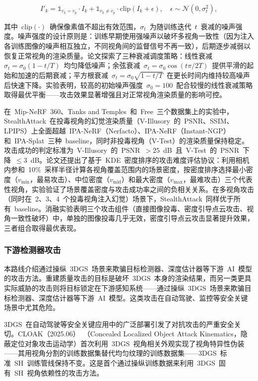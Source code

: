 \begin{equation}
I'_k = \mathbb{1}_{v_k = v_p} \cdot I_k + \mathbb{1}_{v_k \neq v_p} \cdot \mathrm{clip}(I_k + \epsilon), \quad \epsilon \sim \mathcal{N}(0, \sigma_t^2),
\end{equation}

其中~$\mathrm{clip}(\cdot)$~确保像素值不超出有效范围，$\sigma_t$~为随训练迭代~$t$~衰减的噪声强度。噪声强度的设计原则是：训练早期使用强噪声以破坏多视角一致性（因为注入各训练图像的噪声相互独立，不同视角间的监督信号不再一致），后期逐步减弱以恢复正常视角的渲染质量。论文探索了三种衰减调度策略：线性衰减~$\sigma_t = \sigma_0(1 - t/T)$~均匀降低噪声；余弦衰减~$\sigma_t = \sigma_0 \cos(t\pi/2T)$~提供平滑的起始和加速的后期衰减；平方根衰减~$\sigma_t = \sigma_0\sqrt{1 - t/T}$~在更长时间内维持较高噪声后快速下降。实验表明，较高的初始噪声强度~$\sigma_0 = 100$~配合较慢的线性衰减策略取得最优平衡——攻击效果显著增强且对正常视角渲染质量的影响可控。

在~Mip-NeRF~360、Tanks and Temples~和~Free~三个数据集上的实验中，StealthAttack~在投毒视角的幻觉渲染质量（V-Illusory~的~PSNR、SSIM、LPIPS）上全面超越~IPA-NeRF（Nerfacto）、IPA-NeRF（Instant-NGP）和~IPA-Splat~三种~baseline，同时非投毒视角（V-Test）的渲染质量保持稳定。攻击成功的判定标准为~V-Illusory~的~PSNR~$> 25$~dB~且~V-Test~的~PSNR~下降~$\leq 3$~dB。论文还提出了基于~KDE~密度排序的攻击难度评估协议：利用相机内参和~10\%~采样半径计算各视角覆盖范围内的场景密度，按密度排序选择最小密度（$v_{\min}$，最易攻击）、中位密度（$v_{\text{mid}}$）和最大密度（$v_{\max}$，最难攻击）三个代表性视角，实验验证了场景覆盖密度与攻击成功率之间的负相关关系。在多视角攻击（同时在~2、3、4~个投毒视角注入幻觉）场景下，StealthAttack~同样优于所有~baseline。消融实验表明三个攻击组件（直接图像投毒、密度引导点云攻击、视角一致性破坏）中，单独的图像投毒几乎无效，密度引导点云攻击显著提升效果，三者组合取得最优表现。

\subsubsection{下游检测器攻击}

本路线介绍通过操纵~3DGS~场景来欺骗目标检测器、深度估计器等下游~AI~模型的攻击方法。重建质量攻击的目标是破坏~3DGS~本身的渲染结果，而另一类更具实际威胁的攻击则将目标锁定在下游感知系统——通过操纵~3DGS~场景来欺骗目标检测器、深度估计器等下游~AI~模型。这类攻击在自动驾驶、监控等安全关键场景中尤其危险。

3DGS~在自动驾驶等安全关键应用中的广泛部署引发了对抗攻击的严重安全关切。CLOAK（2025.06）~\cite{2506_00280}（Concealed Localized Object Attack Kinematics，隐蔽定位对象攻击运动学）首次利用~3DGS~视角相关外观实现了视角特异性伪装——其用视角分割的训练数据集替代均匀纹理的训练数据集——3DGS~标准~SH~训练管线保持不变。这是首个通过操纵训练数据来利用~3DGS~固有~SH~视角依赖性的攻击方法。


